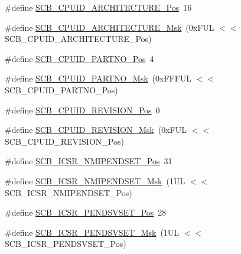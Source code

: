 \begin{DoxyCompactItemize}
\item 
\#define \mbox{\hyperlink{group___c_m_s_i_s___s_c_b_gaf8b3236b08fb8e840efb682645fb0e98}{S\+C\+B\+\_\+\+C\+P\+U\+I\+D\+\_\+\+A\+R\+C\+H\+I\+T\+E\+C\+T\+U\+R\+E\+\_\+\+Pos}}~16
\item 
\#define \mbox{\hyperlink{group___c_m_s_i_s___s_c_b_gafae4a1f27a927338ae9dc51a0e146213}{S\+C\+B\+\_\+\+C\+P\+U\+I\+D\+\_\+\+A\+R\+C\+H\+I\+T\+E\+C\+T\+U\+R\+E\+\_\+\+Msk}}~(0x\+F\+U\+L $<$$<$ S\+C\+B\+\_\+\+C\+P\+U\+I\+D\+\_\+\+A\+R\+C\+H\+I\+T\+E\+C\+T\+U\+R\+E\+\_\+\+Pos)
\item 
\#define \mbox{\hyperlink{group___c_m_s_i_s___s_c_b_ga705f68eaa9afb042ca2407dc4e4629ac}{S\+C\+B\+\_\+\+C\+P\+U\+I\+D\+\_\+\+P\+A\+R\+T\+N\+O\+\_\+\+Pos}}~4
\item 
\#define \mbox{\hyperlink{group___c_m_s_i_s___s_c_b_ga98e581423ca016680c238c469aba546d}{S\+C\+B\+\_\+\+C\+P\+U\+I\+D\+\_\+\+P\+A\+R\+T\+N\+O\+\_\+\+Msk}}~(0x\+F\+F\+F\+U\+L $<$$<$ S\+C\+B\+\_\+\+C\+P\+U\+I\+D\+\_\+\+P\+A\+R\+T\+N\+O\+\_\+\+Pos)
\item 
\#define \mbox{\hyperlink{group___c_m_s_i_s___s_c_b_ga3c3d9071e574de11fb27ba57034838b1}{S\+C\+B\+\_\+\+C\+P\+U\+I\+D\+\_\+\+R\+E\+V\+I\+S\+I\+O\+N\+\_\+\+Pos}}~0
\item 
\#define \mbox{\hyperlink{group___c_m_s_i_s___s_c_b_ga2ec0448b6483f77e7f5d08b4b81d85df}{S\+C\+B\+\_\+\+C\+P\+U\+I\+D\+\_\+\+R\+E\+V\+I\+S\+I\+O\+N\+\_\+\+Msk}}~(0x\+F\+U\+L $<$$<$ S\+C\+B\+\_\+\+C\+P\+U\+I\+D\+\_\+\+R\+E\+V\+I\+S\+I\+O\+N\+\_\+\+Pos)
\item 
\#define \mbox{\hyperlink{group___c_m_s_i_s___s_c_b_ga750d4b52624a46d71356db4ea769573b}{S\+C\+B\+\_\+\+I\+C\+S\+R\+\_\+\+N\+M\+I\+P\+E\+N\+D\+S\+E\+T\+\_\+\+Pos}}~31
\item 
\#define \mbox{\hyperlink{group___c_m_s_i_s___s_c_b_ga340e3f79e9c3607dee9f2c048b6b22e8}{S\+C\+B\+\_\+\+I\+C\+S\+R\+\_\+\+N\+M\+I\+P\+E\+N\+D\+S\+E\+T\+\_\+\+Msk}}~(1\+U\+L $<$$<$ S\+C\+B\+\_\+\+I\+C\+S\+R\+\_\+\+N\+M\+I\+P\+E\+N\+D\+S\+E\+T\+\_\+\+Pos)
\item 
\#define \mbox{\hyperlink{group___c_m_s_i_s___s_c_b_gab5ded23d2ab1d5ff7cc7ce746205e9fe}{S\+C\+B\+\_\+\+I\+C\+S\+R\+\_\+\+P\+E\+N\+D\+S\+V\+S\+E\+T\+\_\+\+Pos}}~28
\item 
\#define \mbox{\hyperlink{group___c_m_s_i_s___s_c_b_ga1e40d93efb402763c8c00ddcc56724ff}{S\+C\+B\+\_\+\+I\+C\+S\+R\+\_\+\+P\+E\+N\+D\+S\+V\+S\+E\+T\+\_\+\+Msk}}~(1\+U\+L $<$$<$ S\+C\+B\+\_\+\+I\+C\+S\+R\+\_\+\+P\+E\+N\+D\+S\+V\+S\+E\+T\+\_\+\+Pos)
\item 
$$
\end{DoxyCompactItemize}
